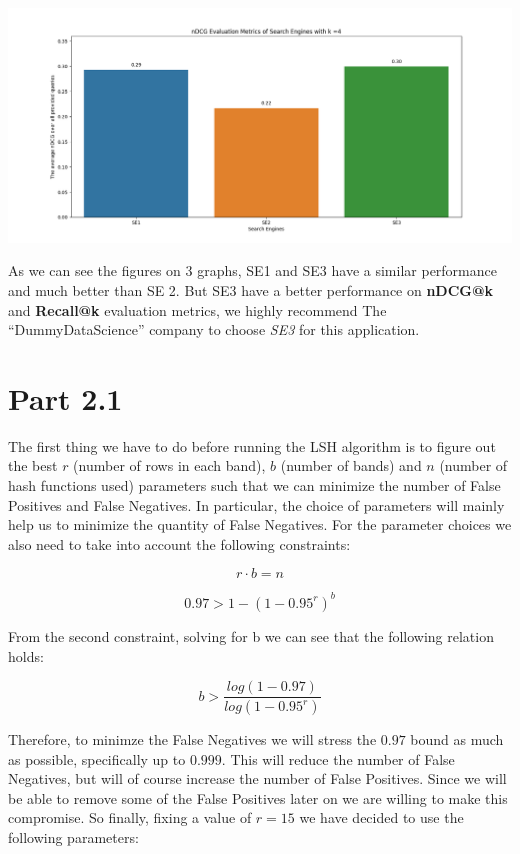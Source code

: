\documentclass[10pt]{article}
\begin{document}
\begin{center}
\includegraphics[scale=.25]{nDCG.png}
\end{center}

As we can see the figures on 3 graphs, SE1 and SE3 have a similar performance and much better than SE 2. But SE3 have a better performance on \textbf{nDCG@k} and \textbf{Recall@k} evaluation metrics, we highly recommend The “DummyDataScience” company to choose \textit{SE3} for this application.

\section{Part 2.1}

The first thing we have to do before running the LSH algorithm is to figure out the best $r$ (number of rows in each band), $b$ (number of bands) and $n$ (number of hash functions used) parameters such that we can minimize the number of False Positives and False Negatives. In particular, the choice of parameters will mainly help us to minimize the quantity of False Negatives. For the parameter choices we also need to take into account the following constraints:

\begin{equation}
r \cdot b = n
\end{equation}


\begin{equation}
0.97 > 1 - (1-0.95^r)^b
\end{equation}

From the second constraint, solving for b we can see that the following relation holds:

\begin{equation}
b > \frac{log(1-0.97)}{log(1-0.95^r)}
\end{equation}

Therefore, to minimze the False Negatives we will stress the $0.97$ bound as much as possible, specifically up to $0.999$. This will reduce the number of False Negatives, but will of course increase the number of False Positives. Since we will be able to remove some of the False Positives later on we are willing to make this compromise. So finally, fixing a value of $r=15$ we have decided to use the following parameters:
\end{document}
